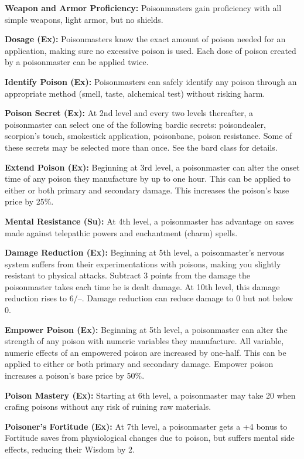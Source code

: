 {
\textbf{Weapon and Armor Proficiency:} Poisonmasters gain proficiency with all simple weapons, light armor, but no shields.

\textbf{Dosage (Ex):} Poisonmasters know the exact amount of poison needed for an application, making sure no excessive poison is used. Each dose of poison created by a poisonmaster can be applied twice.

\textbf{Identify Poison (Ex):} Poisonmasters can safely identify any poison through an appropriate method (smell, taste, alchemical test) without risking harm.

\textbf{Poison Secret (Ex):} At 2nd level and every two levels thereafter, a poisonmaster can select one of the following bardic secrets: poisondealer, scorpion's touch, smokestick application, poisonbane, poison resistance. Some of these secrets may be selected more than once. See the bard class for details.

\textbf{Extend Poison (Ex):} Beginning at 3rd level, a poisonmaster can alter the onset time of any poison they manufacture by up to one hour. This can be applied to either or both primary and secondary damage. This increases the poison's base price by 25\%.

\textbf{Mental Resistance (Su):} At 4th level, a poisonmaster has advantage on saves made against telepathic powers and enchantment (charm) spells.

\textbf{Damage Reduction (Ex):} Beginning at 5th level, a poisonmaster's nervous system suffers from their experimentations with poisons, making you slightly resistant to physical attacks. Subtract 3 points from the damage the poisonmaster takes each time he is dealt damage. At 10th level, this damage reduction rises to 6/--. Damage reduction can reduce damage to 0 but not below 0.

\textbf{Empower Poison (Ex):} Beginning at 5th level, a poisonmaster can alter the strength of any poison with numeric variables they manufacture. All variable, numeric effects of an empowered poison are increased by one‐half. This can be applied to either or both primary and secondary damage. Empower poison increases a poison's base price by 50\%.

\textbf{Poison Mastery (Ex):} Starting at 6th level, a poisonmaster may take 20 when crafing poisons without any risk of ruining raw materials.

\textbf{Poisoner's Fortitude (Ex):} At 7th level, a poisonmaster gets a +4 bonus to Fortitude saves from physiological changes due to poison, but suffers mental side effects, reducing their Wisdom by 2.

}
